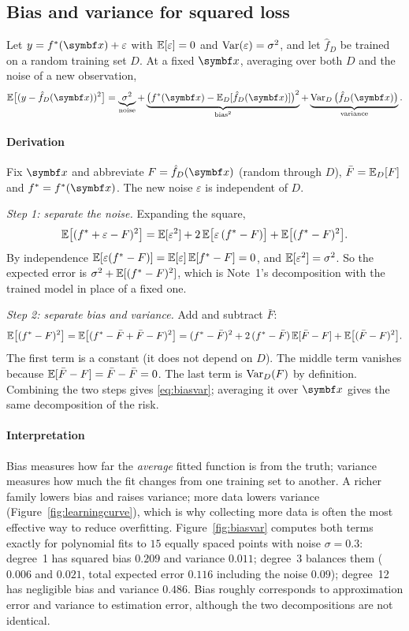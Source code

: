 \documentclass[11pt]{article}
\begin{document}
\subsection{Bias and variance for squared loss}

Let $y = f^*(\x) + \varepsilon$ with $\mathbb{E}[\varepsilon] = 0$ and $\operatorname{Var}(\varepsilon) = \sigma^2$, and let $\hat f_D$ be
trained on a random training set $D$. At a fixed $\x$, averaging over both $D$ and the noise of a new observation,
\begin{equation}\label{eq:biasvar}
  \E\big[(y - \hat f_D(\x))^2\big] = \underbrace{\sigma^2}_{\text{noise}}
  + \underbrace{\big(f^*(\x) - \E_D[\hat f_D(\x)]\big)^2}_{\text{bias}^2}
  + \underbrace{\Var_D\big(\hat f_D(\x)\big)}_{\text{variance}} .
\end{equation}

\paragraph{Derivation} Fix $\x$ and abbreviate $F = \hat f_D(\x)$ (random through $D$), $\bar F = \mathbb{E}_D[F]$ and
$f^* = f^*(\x)$. The new noise $\varepsilon$ is independent of $D$.

\emph{Step 1: separate the noise.} Expanding the square,
\[
  \mathbb{E}\big[(f^* + \varepsilon - F)^2\big] = \mathbb{E}[\varepsilon^2] + 2\,\mathbb{E}\big[\varepsilon\,(f^* - F)\big]
  + \mathbb{E}\big[(f^* - F)^2\big] .
\]
By independence $\mathbb{E}[\varepsilon (f^* - F)] = \mathbb{E}[\varepsilon]\,\mathbb{E}[f^* - F] = 0$, and $\mathbb{E}[\varepsilon^2] = \sigma^2$.
So the expected error is $\sigma^2 + \mathbb{E}[(f^* - F)^2]$, which is Note~1's decomposition with the trained model in
place of a fixed one.

\emph{Step 2: separate bias and variance.} Add and subtract $\bar F$:
\[
  \mathbb{E}\big[(f^* - F)^2\big] = \mathbb{E}\big[(f^* - \bar F + \bar F - F)^2\big]
  = (f^* - \bar F)^2 + 2\,(f^* - \bar F)\,\mathbb{E}[\bar F - F] + \mathbb{E}\big[(\bar F - F)^2\big] .
\]
The first term is a constant (it does not depend on $D$). The middle term vanishes because $\mathbb{E}[\bar F - F] = \bar F -
\bar F = 0$. The last term is $\operatorname{Var}_D(F)$ by definition. Combining the two steps gives \eqref{eq:biasvar}; averaging
it over $\x$ gives the same decomposition of the risk.

\paragraph{Interpretation} Bias measures how far the \emph{average} fitted function is from the truth; variance
measures how much the fit changes from one training set to another. A richer family lowers bias and raises variance;
more data lowers variance (Figure~\ref{fig:learningcurve}), which is why collecting more data is often the most
effective way to reduce overfitting.
Figure~\ref{fig:biasvar} computes both terms exactly for polynomial fits to $15$ equally spaced points with noise
$\sigma = 0.3$: degree~1 has squared bias $0.209$ and variance $0.011$; degree~3 balances them ($0.006$ and $0.021$,
total expected error $0.116$ including the noise $0.09$); degree~12 has negligible bias and variance $0.486$. Bias
roughly corresponds to approximation error and variance to estimation error, although the two decompositions are not
identical.
\end{document}
